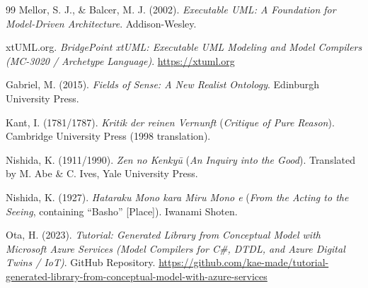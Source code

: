 \documentclass[11pt,a4paper]{article}
\theoremstyle{definition}
\theoremstyle{plain}
\theoremstyle{remark}
\begin{document}
\begin{thebibliography}{99}
Mellor, S. J., \& Balcer, M. J. (2002).
\emph{Executable UML: A Foundation for Model-Driven Architecture}.
Addison-Wesley.

xtUML.org.
\emph{BridgePoint xtUML: Executable UML Modeling and Model Compilers (MC-3020 / Archetype Language)}.
\url{https://xtuml.org}

Gabriel, M. (2015).
\emph{Fields of Sense: A New Realist Ontology}.
Edinburgh University Press.

Kant, I. (1781/1787).
\emph{Kritik der reinen Vernunft} (\emph{Critique of Pure Reason}).
Cambridge University Press (1998 translation).

Nishida, K. (1911/1990).
\emph{Zen no Kenky\=u} (\emph{An Inquiry into the Good}).
Translated by M. Abe \& C. Ives, Yale University Press.

Nishida, K. (1927).
\emph{Hataraku Mono kara Miru Mono e} (\emph{From the Acting to the Seeing}, containing ``Basho'' [Place]).
Iwanami Shoten.

Ota, H. (2023).
\emph{Tutorial: Generated Library from Conceptual Model with Microsoft Azure Services (Model Compilers for C\#, DTDL, and Azure Digital Twins / IoT)}.
GitHub Repository. \url{https://github.com/kae-made/tutorial-generated-library-from-conceptual-model-with-azure-services}

\end{thebibliography}
\end{document}
